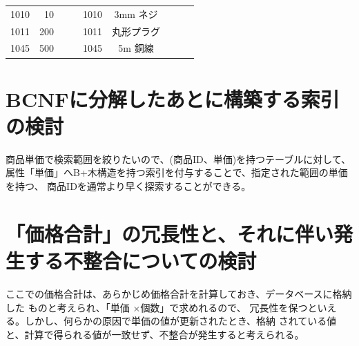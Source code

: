 \documentclass[dvipdfmx,autodetect-engine,titlepage]{jsarticle}
\begin{document}
\begin{table}[h]
\begin{tabular}{cllccclll}
  \multicolumn{1}{|c|}{1010}      & \multicolumn{1}{r|}{10}   & \multicolumn{1}{r}{}     & \multicolumn{1}{c|}{} & \multicolumn{1}{c|}{1010}      & \multicolumn{1}{c|}{3mm ネジ}    &                          &                            &                      \\ \cline{1-2} \cline{5-6}
  \multicolumn{1}{|c|}{1011}      & \multicolumn{1}{r|}{200}  & \multicolumn{1}{r}{}     & \multicolumn{1}{c|}{} & \multicolumn{1}{c|}{1011}      & \multicolumn{1}{c|}{丸形プラグ}     &                          &                            &                      \\ \cline{1-2} \cline{5-6}
  \multicolumn{1}{|c|}{1045}      & \multicolumn{1}{r|}{500}  & \multicolumn{1}{r}{}     & \multicolumn{1}{c|}{} & \multicolumn{1}{c|}{1045}      & \multicolumn{1}{c|}{5m 銅線}     &                          &                            &                      \\ \cline{1-2} \cline{5-6}
  \end{tabular}
  \end{table}

\section{BCNFに分解したあとに構築する索引の検討}

商品単価で検索範囲を絞りたいので、(商品ID、単価)を持つテーブルに対して、
属性「単価」へB+木構造を持つ索引を付与することで、指定された範囲の単価を持つ、
商品IDを通常より早く探索することができる。

\section{「価格合計」の冗長性と、それに伴い発生する不整合についての検討}

ここでの価格合計は、あらかじめ価格合計を計算しておき、データベースに格納した
ものと考えられ、「単価 \begin{math}\times\end{math}個数」で求めれるので、
冗長性を保つといえる。しかし、何らかの原因で単価の値が更新されたとき、格納
されている値と、計算で得られる値が一致せず、不整合が発生すると考えられる。
\end{document}
